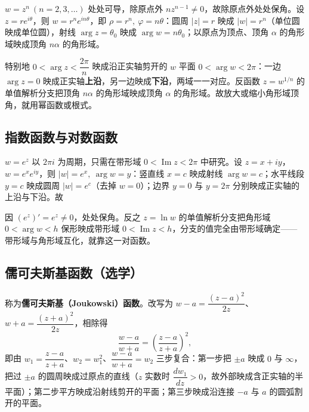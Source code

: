 \(w=z^{n}\ (n=2,3,\dots)\) 处处可导，除原点外 \(nz^{n-1}\neq0\)，故除原点外处处保角。设 \(z=re^{i\theta}\)，则 \(w=r^{n}e^{in\theta}\)，即 \(\rho=r^{n},\ \varphi=n\theta\)：圆周 \(|z|=r\) 映成 \(|w|=r^{n}\)（单位圆映成单位圆），射线 \(\arg z=\theta_{0}\) 映成 \(\arg w=n\theta_{0}\)；以原点为顶点、顶角 \(\alpha\) 的角形域映成顶角 \(n\alpha\) 的角形域。


特别地 \(0<\arg z<\dfrac{2\pi}{n}\) 映成沿正实轴剪开的 \(w\) 平面 \(0<\arg w<2\pi\)：一边 \(\arg z=0\) 映成正实轴\textbf{上沿}，另一边映成\textbf{下沿}，两域一一对应。反函数 \(z=w^{1/n}\) 的单值解析分支把顶角 \(n\alpha\) 的角形域映成顶角 \(\alpha\) 的角形域。故放大或缩小角形域顶角，就用幂函数或根式。

\subsection{指数函数与对数函数}

\(w=e^{z}\) 以 \(2\pi i\) 为周期，只需在带形域 \(0<\operatorname{Im}z<2\pi\) 中研究。设 \(z=x+iy\)，\(w=e^{x}e^{iy}\)，则 \(|w|=e^{x},\ \arg w=y\)：竖直线 \(x=c\) 映成射线 \(\arg w=c\)；水平线段 \(y=c\) 映成圆周 \(|w|=e^{c}\)（去掉 \(w=0\)）；边界 \(y=0\) 与 \(y=2\pi\) 分别映成正实轴的上沿与下沿。故


因 \((e^{z})'=e^{z}\neq0\)，处处保角。反之 \(z=\ln w\) 的单值解析分支把角形域 \(0<\arg w<h\) 保形映成带形域 \(0<\operatorname{Im}z<h\)，分支的值完全由带形域确定——带形域与角形域互化，就靠这一对函数。

\subsection{儒可夫斯基函数（选学）}


称为\textbf{儒可夫斯基（Joukowski）函数}。改写为 \(w-a=\dfrac{(z-a)^{2}}{2z}\)、\(w+a=\dfrac{(z+a)^{2}}{2z}\)，相除得
\[
\frac{w-a}{w+a}=\left(\frac{z-a}{z+a}\right)^{2},
\]
即由 \(w_{1}=\dfrac{z-a}{z+a}\)、\(w_{2}=w_{1}^{2}\)、\(\dfrac{w-a}{w+a}=w_{2}\) 三步复合：第一步把 \(\pm a\) 映成 \(0\) 与 \(\infty\)，把过 \(\pm a\) 的圆周映成过原点的直线（\(z\) 实数时 \(\dfrac{dw_{1}}{dz}>0\)，故外部映成含正实轴的半平面）；第二步平方映成沿射线剪开的平面；第三步映成沿连接 \(-a\) 与 \(a\) 的圆弧割开的平面。

